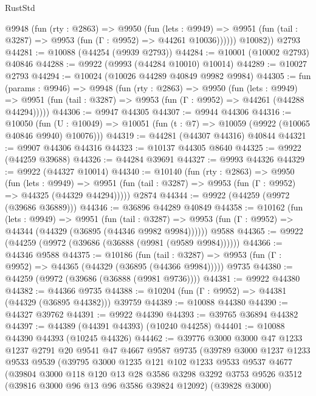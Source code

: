 \begin{lexlean}{RustStd}
\begin{coremodule}
          @9948
            (fun (rty : @2863) =>
            @9950
              (fun (lets : @9949) =>
              @9951 (fun (tail : @3287) => @9953 (fun (Γ : @9952) => @44261 @10036))))))
        @10082))
    @2793
@44281 := @10088 (@44254 (@9939 @2793))
@44284 := @10001 (@10002 @2793) @40846
@44288 := @9922 (@9993 (@44284 @10010) @10014)
@44289 := @10027 @2793
@44294 := @10024 (@10026 @44289 @40849 @9982 @9984)
@44305 := fun (params : @9946) =>
  @9948
    (fun (rty : @2863) =>
    @9950
      (fun (lets : @9949) =>
      @9951 (fun (tail : @3287) => @9953 (fun (Γ : @9952) => @44261 (@44288 @44294)))))
@44306 := @9947 @44305
@44307 := @9944 @44306
@44316 := @10050
    (fun (U : @10049) => @10051 (fun (t : @7) => @10059 (@9922 (@10065 @40846 @9940) @10076)))
@44319 := @44281 (@44307 @44316) @40844
@44321 := @9907 @44306 @44316
@44323 := @10137 @44305 @8640
@44325 := @9922 (@44259 @39688)
@44326 := @44284 @39691
@44327 := @9993 @44326
@44329 := @9922 (@44327 @10014)
@44340 := @10140
    (fun (rty : @2863) =>
    @9950
      (fun (lets : @9949) =>
      @9951 (fun (tail : @3287) => @9953 (fun (Γ : @9952) => @44325 (@44329 @44294)))))
    @2874
@44344 := @9922 (@44259 (@9972 (@39686 @36889)))
@44346 := @36896 @44289 @40849
@44358 := @10162
    (fun (lets : @9949) =>
    @9951
      (fun (tail : @3287) =>
      @9953 (fun (Γ : @9952) => @44344 (@44329 (@36895 (@44346 @9982 @9984))))))
    @9588
@44365 := @9922 (@44259 (@9972 (@39686 (@36888 (@9981 (@9589 @9984))))))
@44366 := @44346 @9588
@44375 := @10186
    (fun (tail : @3287) => @9953 (fun (Γ : @9952) => @44365 (@44329 (@36895 (@44366 @9984)))))
    @9735
@44380 := @44259 (@9972 (@39686 (@36888 (@9981 @9736))))
@44381 := @9922 @44380
@44382 := @44366 @9735
@44388 := @10204 (fun (Γ : @9952) => @44381 (@44329 (@36895 @44382))) @39759
@44389 := @10088 @44380
@44390 := @44327 @39762
@44391 := @9922 @44390
@44393 := @39765 @36894 @44382
@44397 := @44389 (@44391 @44393) (@10240 @44258)
@44401 := @10088 @44390 @44393 (@10245 @44326)
@44462 := @39776
    @3000
    @3000
    @47
    @1233
    @1237
    @2791
    @20
    @9541
    @47
    @4667
    @9587
    @9735
    (@39789
      @3000
      @1237
      @1233
      @9533
      @9539
      (@39795
        @3000
        @1235
        @121
        @102
        @1233
        @9533
        @9537
        @4677
        (@39804
          @3000
          @118
          @120
          @13
          @28
          @3586
          @3298
          @3292
          @3753
          @9526
          @3512
          (@39816 @3000 @96 @13 @96 @3586 @39824 @12092)
          (@39828 @3000)

\end{coremodule}
\end{lexlean}
